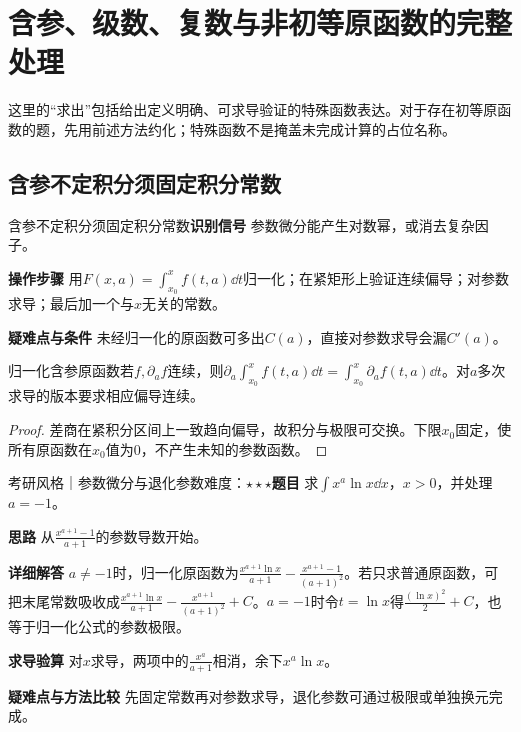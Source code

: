\section{含参、级数、复数与非初等原函数的完整处理}\label{ic:indefinite_special_complete}

\begin{examtip}这里的“求出”包括给出定义明确、可求导验证的特殊函数表达。对于存在初等原函数的题，先用前述方法约化；特殊函数不是掩盖未完成计算的占位名称。\end{examtip}

\subsection{含参不定积分须固定积分常数}\label{ic:indefinite_special_complete:parameter}\begin{method}{含参不定积分须固定积分常数}\textbf{识别信号} 参数微分能产生对数幂，或消去复杂因子。\par \textbf{操作步骤} 用$F(x,a)=\int_{x_0}^xf(t,a)\dd t$归一化；在紧矩形上验证连续偏导；对参数求导；最后加一个与$x$无关的常数。\par \textbf{疑难点与条件} 未经归一化的原函数可多出$C(a)$，直接对参数求导会漏$C'(a)$。\end{method}

\begin{theorem}{归一化含参原函数}若$f,\partial_af$连续，则$\partial_a\int_{x_0}^xf(t,a)\dd t=\int_{x_0}^x\partial_af(t,a)\dd t$。对$a$多次求导的版本要求相应偏导连续。\end{theorem}\begin{proof}差商在紧积分区间上一致趋向偏导，故积分与极限可交换。下限$x_0$固定，使所有原函数在$x_0$值为0，不产生未知的参数函数。\end{proof}

\begin{example}{考研风格｜参数微分与退化参数}{难度：$\star\star\star$}\label{ic:ex:indefinite_special_complete:parampower}\textbf{题目} 求$\int x^a\ln x\dd x$，$x>0$，并处理$a=-1$。\par \textbf{思路} 从$\frac{x^{a+1}-1}{a+1}$的参数导数开始。\par \textbf{详细解答} $a\ne-1$时，归一化原函数为$\frac{x^{a+1}\ln x}{a+1}-\frac{x^{a+1}-1}{(a+1)^2}$。若只求普通原函数，可把末尾常数吸收成$\frac{x^{a+1}\ln x}{a+1}-\frac{x^{a+1}}{(a+1)^2}+C$。$a=-1$时令$t=\ln x$得$\frac{(\ln x)^2}{2}+C$，也等于归一化公式的参数极限。\par \textbf{求导验算} 对$x$求导，两项中的$\frac{x^a}{a+1}$相消，余下$x^a\ln x$。\par \textbf{疑难点与方法比较} 先固定常数再对参数求导，退化参数可通过极限或单独换元完成。\end{example}


